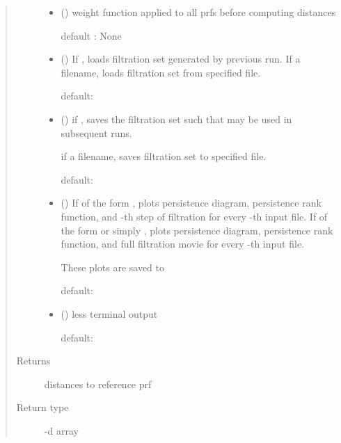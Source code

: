 \documentclass[letterpaper,10pt,openany,oneside,english]{sphinxmanual}
\begin{document}
\begin{fulllineitems}
\begin{quote}
\begin{description}
\begin{itemize}
\item {} 
 (\sphinxstyleliteralemphasis{, }) \textendash{} 
weight function applied to all prfs before computing distances

default : None


\item {} 
 (\sphinxstyleliteralemphasis{, }) \textendash{} 
If , loads filtration set generated by previous run. If a filename,
loads filtration set from specified file.

default: 


\item {} 
 (\sphinxstyleliteralemphasis{, }) \textendash{} 
if , saves the filtration set such that 
may     be used in subsequent runs.

if a filename, saves filtration set to specified file.

default: 


\item {} 
 (\sphinxstyleliteralemphasis{, }) \textendash{} 
If of the form , plots persistence
diagram, persistence rank function, and -th step of filtration for
every -th input file.
If of the form  or simply , plots persistence
diagram, persistence rank function, and full filtration movie for every
-th input file.

These plots are saved to 

default: 


\item {} 
 (\sphinxstyleliteralemphasis{, }) \textendash{} 
less terminal output

default: 


\end{itemize}

\item[{Returns}] \leavevmode
distances to reference prf

\item[{Return type}] -d array

\end{description}\end{quote}

\end{fulllineitems}
\end{document}
